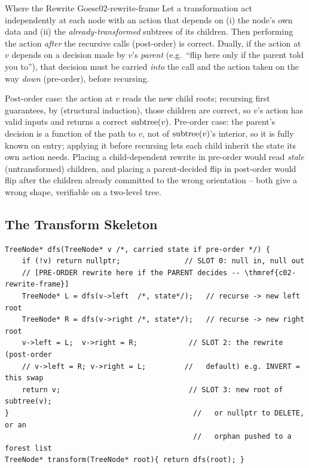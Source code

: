 \begin{theorem}{Where the Rewrite Goes}{c02-rewrite-frame}
Let a transformation act independently at each node with an action that depends
on (i) the node's own data and (ii) the \emph{already-transformed} subtrees of its
children. Then performing the action \emph{after} the recursive calls
(post-order) is correct. Dually, if the action at $v$ depends on a decision made
by $v$'s \emph{parent} (e.g.\ ``flip here only if the parent told you to''), that
decision must be carried \emph{into} the call and the action taken on the way
\emph{down} (pre-order), before recursing.
\end{theorem}
\begin{proofbox}
Post-order case: the action at $v$ reads the new child roots; recursing first
guarantees, by  (structural induction), those children are
correct, so $v$'s action has valid inputs and returns a correct $\operatorname{subtree}(v)$.
Pre-order case: the parent's decision is a function of the path to $v$, not of
$\operatorname{subtree}(v)$'s interior, so it is fully known on entry; applying it before
recursing lets each child inherit the state its own action needs. Placing a
child-dependent rewrite in pre-order would read \emph{stale} (untransformed)
children, and placing a parent-decided flip in post-order would flip after the
children already committed to the wrong orientation -- both give a wrong shape,
verifiable on a two-level tree.
\end{proofbox}

\subsection{The Transform Skeleton}

\begin{lstlisting}[caption={The transforming recursion: SLOT 1 (recurse), SLOT 2 (the rewrite), SLOT 3 (what to return). Which side SLOT 2 goes on is decided by \thmref{c02-rewrite-frame}.}, label={lst:c02-transform-skeleton}]
TreeNode* dfs(TreeNode* v /*, carried state if pre-order */) {
    if (!v) return nullptr;               // SLOT 0: null in, null out
    // [PRE-ORDER rewrite here if the PARENT decides -- \thmref{c02-rewrite-frame}]
    TreeNode* L = dfs(v->left  /*, state*/);   // recurse -> new left root
    TreeNode* R = dfs(v->right /*, state*/);   // recurse -> new right root
    v->left = L;  v->right = R;            // SLOT 2: the rewrite (post-order
    // v->left = R; v->right = L;         //   default) e.g. INVERT = this swap
    return v;                              // SLOT 3: new root of subtree(v);
}                                           //   or nullptr to DELETE, or an
                                            //   orphan pushed to a forest list
TreeNode* transform(TreeNode* root){ return dfs(root); }
\end{lstlisting}

